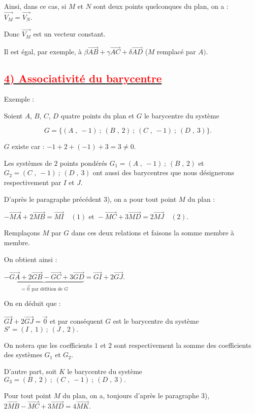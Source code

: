 \documentclass{article}
\begin{document}
Ainsi, dans ce cas, si $M$ et $N$ sont deux points quelconques du plan, on a : $\overrightarrow{V_{M}}=\overrightarrow{V_{N}}.$

Donc $\overrightarrow{V_{M}}$ est un vecteur constant.

Il est égal, par exemple, à $\beta\overrightarrow{AB}+\gamma\overrightarrow{AC}+\delta\overrightarrow{AD}$ ($M$ remplacé par $A).$

\subsection*{\underline{\textbf{\textcolor{red}{4) Associativité du barycentre}}}}
Exemple :

		Soient $A$, $B$, $C$, $D$ quatre points du plan et $G$ le barycentre du système

		$$G=\{(A\;,\ -1)\ ;\ (B\;,\ 2)\ ;\ (C\;,\ -1)\ ;\ (D\;,\ 3)\}.$$
		
		$G$ existe car : $-1+2+(-1)+3=3\neq 0.$
		
		Les systèmes de $2$ points pondérés $G_{1}={(A\;,\ -1)\ ;\ (B\;,\ 2)}$ et $G_{2}={(C\;,\ -1)\ ;\ (D\;,\ 3)}$ ont aussi des barycentres que nous désignerons respectivement par $I$ et $J.$

		D'après le paragraphe précédent 3), on a pour tout point $M$ du plan :
		
		$-\overrightarrow{MA}+2\overrightarrow{MB}=\overrightarrow{MI}\quad(1)\text{ et }-\overrightarrow{MC}+3\overrightarrow{MD}=2\overrightarrow{MJ}\quad(2).$
		
		Remplaçons $M$ par $G$ dans ces deux relations et faisons la somme membre à membre. 
		
		On obtient ainsi : 
		
		$\underbrace{-\overrightarrow{GA}+2\overrightarrow{GB}-\overrightarrow{GC}+3\overrightarrow{GD}}_{=\vec{0}\text{ par défition de }G}=\overrightarrow{GI}+2\overrightarrow{GJ}.$
		
		On en déduit que : 
		
		$\overrightarrow{GI}+2\overrightarrow{GJ}=\vec{0}$ et par conséquent $G$ est le barycentre du système $S'={(I\;,\ 1)\ ;\ (J\;,\ 2)}.$
		
		On notera que les coefficients $1$ et $2$ sont respectivement la somme des coefficients des systèmes $G_{1}$ et $G_{2}.$
		
		D'autre part, soit $K$ le barycentre du système $G_{3}={(B\;,\ 2)\ ;\ (C\;,\ -1)\ ;\ (D\;,\ 3)}.$
		
		Pour tout point $M$ du plan, on a, toujours d'après le paragraphe 3), $2\overrightarrow{MB}-\overrightarrow{MC}+3\overrightarrow{MD}=4\overrightarrow{MK}.$
		
\end{document}
